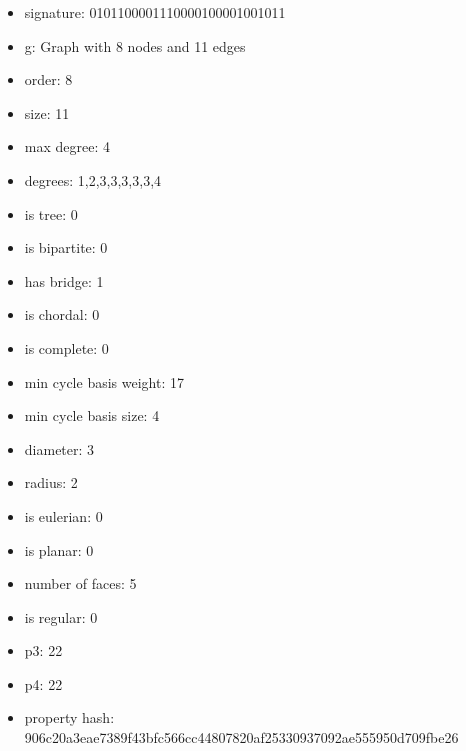 \begin{itemize}
\item signature: 0101100001110000100001001011
\item g: Graph with 8 nodes and 11 edges
\item order: 8
\item size: 11
\item max degree: 4
\item degrees: 1,2,3,3,3,3,3,4
\item is tree: 0
\item is bipartite: 0
\item has bridge: 1
\item is chordal: 0
\item is complete: 0
\item min cycle basis weight: 17
\item min cycle basis size: 4
\item diameter: 3
\item radius: 2
\item is eulerian: 0
\item is planar: 0
\item number of faces: 5
\item is regular: 0
\item p3: 22
\item p4: 22
\item property hash: 906c20a3eae7389f43bfc566cc44807820af25330937092ae555950d709fbe26
\end{itemize}
\newpage
\begin{figure}
\end{figure}
